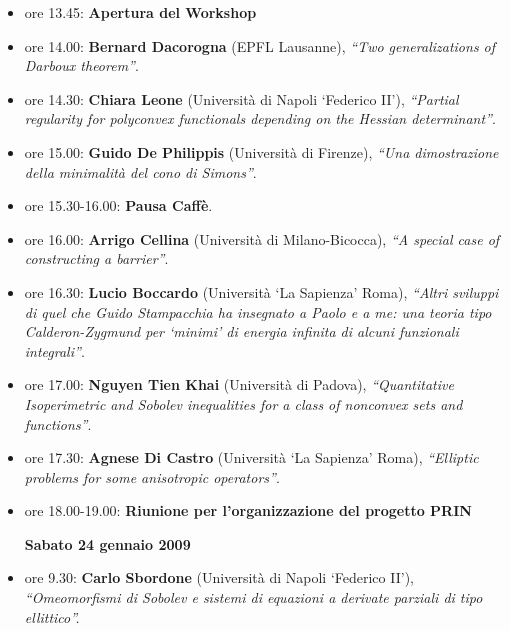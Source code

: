 \documentclass[12pt]{article}
\begin{document}
\begin{itemize}

\centerline{\bf Venerd\`i 23 gennaio 2009}

\item{ore 13.45: {\bf Apertura del Workshop}} 

\item{ore 14.00: {\bf Bernard Dacorogna} (EPFL Lausanne),}
\emph{``Two generalizations of Darboux theorem''}. 

\item{ore 14.30: {\bf Chiara Leone} (Universit\`a di Napoli `Federico II'),}
\emph{``Partial regularity for polyconvex functionals depending on 
the Hessian determinant''}.

\item{ore 15.00: {\bf  Guido De Philippis} (Universit\`a di Firenze),}
\emph{``Una dimostrazione della minimalit\`a del cono di Simons''}.

\item{ore 15.30-16.00: {\bf Pausa Caff\`e}.}

\item{ore 16.00: {\bf Arrigo Cellina} (Universit\`a di Milano-Bicocca),} 
\emph{``A special case of constructing a barrier''}.

\item{ore 16.30: {\bf Lucio Boccardo} (Universit\`a `La Sapienza' Roma),}
\emph{``Altri sviluppi di quel che Guido Stampacchia ha insegnato a 
Paolo e a me: una teoria tipo Calderon-Zygmund   per `minimi' di 
energia infinita di alcuni funzionali integrali''}.

\item{ore 17.00: {\bf Nguyen Tien Khai} (Universit\`a di Padova),}
\emph{``Quantitative Isoperimetric and Sobolev inequalities for a class of
nonconvex sets and functions''}.

\item{ore 17.30: {\bf Agnese Di Castro} (Universit\`a `La Sapienza' Roma),}
\emph{``Elliptic problems for some anisotropic operators''}.

\item{ore 18.00-19.00: {\bf Riunione per l'organizzazione del progetto 
PRIN}}


\vspace*{0.5truein}

\newpage

\centerline{\bf Sabato 24 gennaio 2009}



\item{ore 9.30: {\bf Carlo Sbordone} (Universit\`a di Napoli `Federico II'),}
\emph{``Omeomorfismi di Sobolev e sistemi di equazioni a derivate 
parziali di tipo ellittico''.}


\end{itemize}
\end{document}
